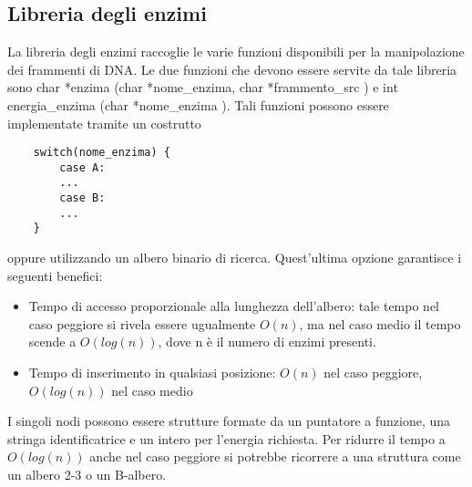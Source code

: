 \documentclass[a4paper,10pt]{article}
\begin{document}
\subsection{Libreria degli enzimi}
La libreria degli enzimi raccoglie le varie funzioni disponibili per la manipolazione dei frammenti di DNA.
Le due funzioni che devono essere servite da tale libreria sono char *enzima (char *nome\_{}enzima, char *frammento\_{}src ) e int energia\_{}enzima (char *nome\_{}enzima ).
Tali funzioni possono essere implementate tramite un costrutto \begin{verbatim}
    switch(nome_enzima) {
        case A:
        ...
        case B:
        ...
    }
\end{verbatim} oppure utilizzando un albero binario di ricerca. Quest'ultima opzione garantisce i seguenti benefici:
\begin{itemize}
\item Tempo di accesso proporzionale alla lunghezza dell'albero: tale tempo nel caso peggiore si rivela essere ugualmente $O(n)$, ma nel caso medio il tempo scende a $O(log(n))$, dove n è il numero di enzimi presenti.
\item Tempo di inserimento in qualsiasi posizione: $O(n)$ nel caso peggiore, $O(log(n))$ nel caso medio
\end{itemize} I singoli nodi possono essere strutture formate da un puntatore a funzione, una stringa identificatrice e un intero per l'energia richiesta.
Per ridurre il tempo a $O(log(n))$ anche nel caso peggiore si potrebbe ricorrere a una struttura come un albero 2-3 o un B-albero.
\end{document}
